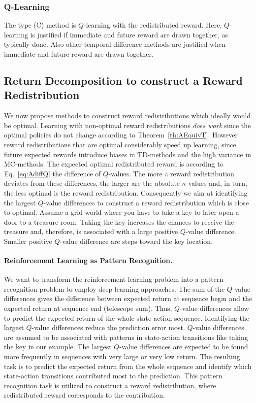 \documentclass{article}
\begin{document}
\begin{appendices}
\subsubsection{Q-Learning}
\label{sec:qlearningA}
The type (C) method is $Q$-learning with the redistributed reward. 
Here, $Q$-learning is justified if
immediate and future reward are drawn together,
as typically done.
Also other temporal difference methods are justified when
immediate and future reward are drawn together.

\subsection{Return Decomposition to construct a Reward Redistribution}


We now propose methods to construct reward redistributions which 
ideally would be optimal. 
Learning with non-optimal reward redistributions {\em does work} since the 
optimal policies do not change according to Theorem~\ref{th:AEquivT}.
However reward redistributions that are optimal considerably speed up learning,
since future expected rewards introduce 
biases in TD-methods and the high variance in MC-methods.
The expected optimal redistributed reward is according to Eq.~\eqref{eq:AdiffQ} 
the difference of $Q$-values. 
The more a reward redistribution deviates from these differences,
the larger are the absolute $\kappa$-values and, in turn, the less optimal
is the reward redistribution.
Consequently we aim at identifying the largest $Q$-value differences to
construct a reward redistribution which is close to optimal.
Assume a grid world where you have to take a key to later open a door
to a treasure room. Taking the key increases the chances to receive the
treasure and, therefore, is associated with a large positive $Q$-value difference.
Smaller positive $Q$-value difference are steps toward the key location.

\paragraph{Reinforcement Learning as Pattern Recognition.}
We want to transform the reinforcement learning problem into
a pattern recognition problem to employ deep learning approaches.
The sum of the $Q$-value differences gives the 
difference between expected return at sequence begin and
the expected return at sequence end (telescope sum).
Thus, $Q$-value differences allow to predict the 
expected return of the whole state-action sequence.
Identifying the largest $Q$-value differences 
reduce the prediction error most.
$Q$-value differences are assumed to be associated with
patterns in state-action transitions 
like taking the key in our example. 
The largest $Q$-value differences 
are expected to be found more frequently in sequences
with very large or very low return.
The resulting task is to predict the expected return
from the whole sequence and identify which 
state-action transitions contributed most to the prediction.
This pattern recognition task is utilized to
construct a reward redistribution, where redistributed reward
corresponds to the contribution.



\end{appendices}
\end{document}
